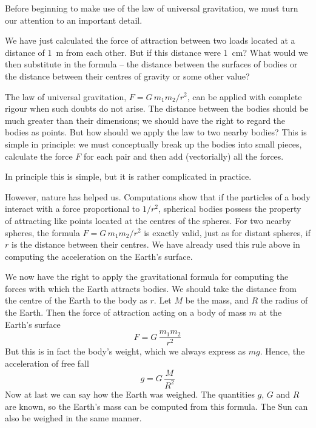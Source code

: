 Before beginning to make use of the law of universal
gravitation, we must turn our attention to an important
detail.

We have just calculated the force of attraction between
two loads located at a distance of \SI{1}{\meter} from each other.
But if this distance were \SI{1}{\centi\meter}? What would we then substitute in the formula -- the distance between the surfaces
of bodies or the distance between their centres of gravity
or some other value?

The law of universal gravitation, $F = G \, m_{1}m_{2}/r^{2}$, can
be applied with complete rigour when such doubts do not
arise. The distance between the bodies should be much
greater than their dimensions; we should have the right
to regard the bodies as points. But how should we apply
the law to two nearby bodies? This is simple in principle:
we must conceptually break up the bodies into small
pieces, calculate the force $F$ for each pair and then add
(vectorially) all the forces.

In principle this is simple, but it is rather complicated
in practice.

However, nature has helped us. Computations show that
if the particles of a body interact with a force proportional to $1/r^{2}$, spherical bodies possess the property of attracting like points located at the centres of the spheres. For two nearby spheres, the formula $F = G \,m_{1}m_{2}/r^{2}$ is exactly
valid, just as for distant spheres, if $r$ is the distance between their centres. We have already used this rule above
in computing the acceleration on the Earth's surface.

We now have the right to apply the gravitational formula for computing the forces with which the Earth
attracts bodies. We should take the distance from the
centre of the Earth to the body as $r$. Let $M$ be the mass, and $R$ the radius of the Earth. Then the force of attraction acting on a body of mass $m$ at the Earth's surface
 \begin{equation*}%
F = G \, \dfrac{m_{1}m_{2}}{r^{2}}
 \end{equation*}
But this is in fact the body's weight, which we always
express as $mg$. Hence, the acceleration of free fall
 \begin{equation*}%
g = G \, \dfrac{M}{R^{2}}
 \end{equation*}
 Now at last we can say how the Earth was weighed.
The quantities $g$, $G$ and $R$ are known, so the Earth's
mass can be computed from this formula. The Sun can
also be weighed in the same manner.

